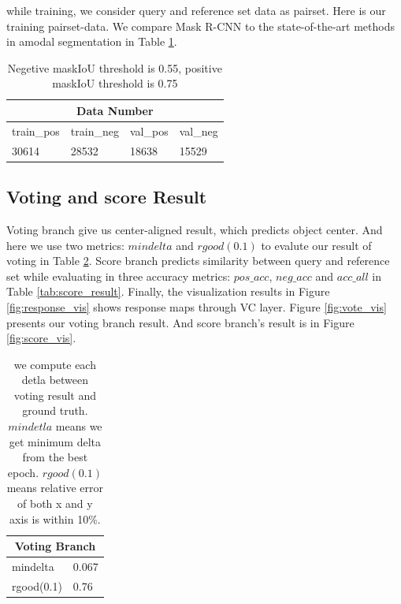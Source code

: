 \documentclass[10pt,twocolumn,letterpaper]{article}
\begin{document}
while training, we consider query and reference set data as pairset. Here is our training pairset-data. We compare Mask R-CNN to the state-of-the-art  methods in amodal segmentation in Table \ref{tab:data number}.

\begin{table}[h]
	\begin{center}
		
		\begin{tabular}{llll}
			\multicolumn{4}{c}{Data Number} \\
			\hline
			train\_{pos} & train\_{neg}&val\_{pos} & val\_{neg} \\
			\hline
			30614 & 28532 & 18638 & 15529 \\
		
		\end{tabular}
		
	\end{center}
	\caption{Negetive maskIoU
		threshold is 0.55, positive maskIoU threshold is 0.75}
\label{tab:data number}
\end{table}



\subsection{Voting and score Result}
Voting branch give us center-aligned result, which predicts object center. And here we use two metrics: $mindelta$ and $rgood(0.1)$ to evalute our result of voting in Table \ref{tab:vote_result}. Score branch predicts similarity between query and reference set while evaluating in three accuracy metrics: $pos\_acc$, $neg\_acc$ and $acc\_all$ in Table \ref{tab:score_result}. Finally,
the visualization results in Figure \ref{fig:response_vis} shows response maps through VC layer. Figure \ref{fig:vote_vis} presents our voting branch result. And score branch's result is in Figure \ref{fig:score_vis}.
\begin{table}[h]
	\begin{center}
		\begin{tabular}{ll}
			\multicolumn{2}{c}{Voting Branch} \\
			\hline
			mindelta &  0.067   \\
			\hline
			rgood(0.1)& 0.76  \\
		\end{tabular}

	\end{center}
	\caption{we compute each detla between voting result and ground truth. $ mindetla $ means we get minimum delta from the best epoch. $ rgood(0.1) $ means relative error of both x and y axis is within 10\%. }
	\label{tab:vote_result}
\end{table}
\end{document}
